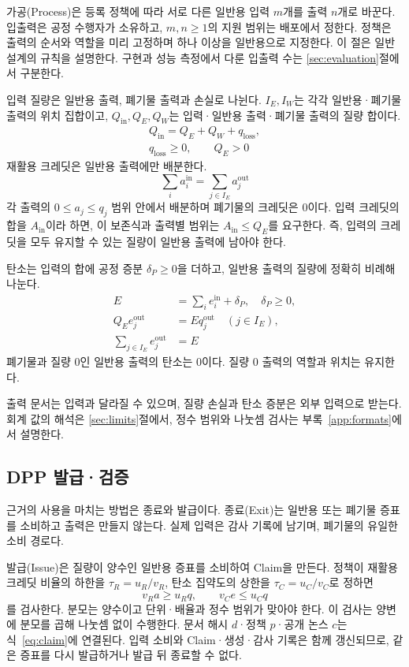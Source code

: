 가공(Process)은 등록 정책에 따라 서로 다른 일반용 입력 $m$개를
출력 $n$개로 바꾼다. 입출력은 공정 수행자가 소유하고,
$m,n\geq1$의 지원 범위는 배포에서 정한다. 정책은 출력의 순서와
역할을 미리 고정하며 하나 이상을 일반용으로 지정한다.
이 절은 일반 설계의 규칙을 설명한다. 구현과 성능 측정에서 다룬
입출력 수는 \ref{sec:evaluation}절에서 구분한다.

입력 질량은 일반용 출력, 폐기물 출력과 손실로 나뉜다.
$I_E,I_W$는 각각 일반용·폐기물 출력의 위치 집합이고,
$Q_{\mathrm{in}},Q_E,Q_W$는 입력·일반용 출력·폐기물 출력의 질량 합이다.
\begin{equation}
 \begin{gathered}
 Q_{\mathrm{in}}=Q_E+Q_W+q_{\mathrm{loss}},\\
 q_{\mathrm{loss}}\geq0,\qquad Q_E>0
 \end{gathered}
 \label{eq:mass}
\end{equation}
재활용 크레딧은 일반용 출력에만 배분한다.
\begin{equation}
 \sum_i a_i^{\mathrm{in}}=\sum_{j\in I_E}a_j^{\mathrm{out}}
 \label{eq:credit}
\end{equation}
각 출력의 $0\leq a_j\leq q_j$ 범위 안에서 배분하며 폐기물의 크레딧은 0이다.
입력 크레딧의 합을 $A_{\mathrm{in}}$이라 하면,
이 보존식과 출력별 범위는 $A_{\mathrm{in}}\leq Q_E$를 요구한다.
즉, 입력의 크레딧을 모두 유지할 수 있는 질량이 일반용 출력에 남아야 한다.

탄소는 입력의 합에 공정 증분 $\delta_P\geq0$을 더하고,
일반용 출력의 질량에 정확히 비례해 나눈다.
\begin{align}
 E&=\sum_i e_i^{\mathrm{in}}+\delta_P,\quad\delta_P\geq0,\nonumber\\
 Q_Ee_j^{\mathrm{out}}&=Eq_j^{\mathrm{out}}\quad(j\in I_E),\nonumber\\
 \sum_{j\in I_E}e_j^{\mathrm{out}}&=E
 \label{eq:process-carbon}
\end{align}
폐기물과 질량 0인 일반용 출력의 탄소는 0이다.
질량 0 출력의 역할과 위치는 유지한다.

출력 문서는 입력과 달라질 수 있으며, 질량 손실과 탄소 증분은
외부 입력으로 받는다. 회계 값의 해석은 \ref{sec:limits}절에서,
정수 범위와 나눗셈 검사는 부록~\ref{app:formats}에서 설명한다.

\subsection{DPP 발급·검증}
\label{sec:dpp}

근거의 사용을 마치는 방법은 종료와 발급이다.
종료(Exit)는 일반용 또는 폐기물 증표를 소비하고 출력은 만들지 않는다.
실제 입력은 감사 기록에 남기며, 폐기물의 유일한 소비 경로다.

발급(Issue)은 질량이 양수인 일반용 증표를 소비하여 Claim을 만든다.
정책이 재활용 크레딧 비율의 하한을 $\tau_R=u_R/v_R$,
탄소 집약도의 상한을 $\tau_C=u_C/v_C$로 정하면
\begin{equation}
 v_Ra\geq u_Rq,\qquad v_Ce\leq u_Cq
 \label{eq:issue}
\end{equation}
를 검사한다. 분모는 양수이고 단위·배율과 정수 범위가 맞아야 한다.
이 검사는 양변에 분모를 곱해 나눗셈 없이 수행한다.
문서 해시 $d$·정책 $p$·공개 논스 $c$는 식~\eqref{eq:claim}에 연결된다.
입력 소비와 Claim·생성·감사 기록은 함께 갱신되므로,
같은 증표를 다시 발급하거나 발급 뒤 종료할 수 없다.
